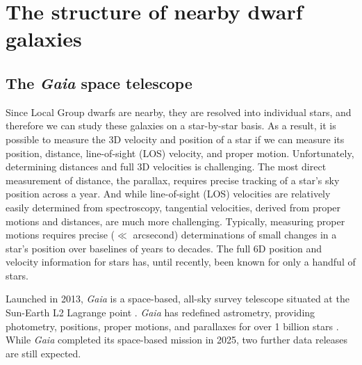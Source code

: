 \section{The structure of nearby dwarf
galaxies}\label{the-structure-of-nearby-dwarf-galaxies}

\subsection{\texorpdfstring{The \emph{Gaia} space
telescope}{The Gaia space telescope}}\label{the-gaia-space-telescope}

Since Local Group dwarfs are nearby, they are resolved into individual
stars, and therefore we can study these galaxies on a star-by-star
basis. As a result, it is possible to measure the 3D velocity and
position of a star if we can measure its position, distance,
line-of-sight (LOS) velocity, and proper motion. Unfortunately,
determining distances and full 3D velocities is challenging. The most
direct measurement of distance, the parallax, requires precise tracking
of a star's sky position across a year. And while line-of-sight (LOS)
velocities are relatively easily determined from spectroscopy,
tangential velocities, derived from proper motions and distances, are
much more challenging. Typically, measuring proper motions requires
precise (\(\ll\) arcsecond) determinations of small changes in a star's
position over baselines of years to decades. The full 6D position and
velocity information for stars has, until recently, been known for only
a handful of stars.

Launched in 2013, \emph{Gaia} is a space-based, all-sky survey telescope
situated at the Sun-Earth L2 Lagrange point
\citep{gaiacollaboration+2016}. \emph{Gaia} has redefined astrometry,
providing photometry, positions, proper motions, and parallaxes for over
1 billion stars \citep{gaiacollaboration+2021}. While \emph{Gaia}
completed its space-based mission in 2025, two further data releases are
still expected.

